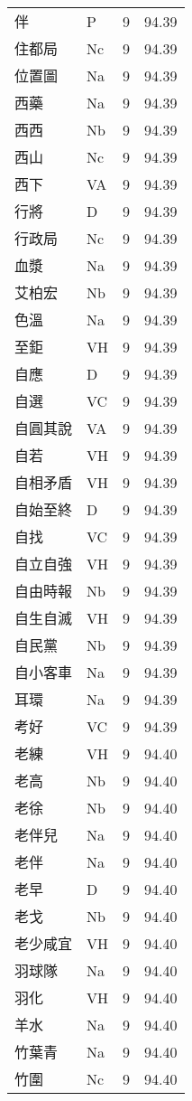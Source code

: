 \documentclass[twocolumn]{book}
\begin{document}
\begin{supertabular}{llrr}
伴 & P & 9 &  94.39\\
住都局 & Nc & 9 &  94.39\\
位置圖 & Na & 9 &  94.39\\
西藥 & Na & 9 &  94.39\\
西西 & Nb & 9 &  94.39\\
西山 & Nc & 9 &  94.39\\
西下 & VA & 9 &  94.39\\
行將 & D & 9 &  94.39\\
行政局 & Nc & 9 &  94.39\\
血漿 & Na & 9 &  94.39\\
艾柏宏 & Nb & 9 &  94.39\\
色溫 & Na & 9 &  94.39\\
至鉅 & VH & 9 &  94.39\\
自應 & D & 9 &  94.39\\
自選 & VC & 9 &  94.39\\
自圓其說 & VA & 9 &  94.39\\
自若 & VH & 9 &  94.39\\
自相矛盾 & VH & 9 &  94.39\\
自始至終 & D & 9 &  94.39\\
自找 & VC & 9 &  94.39\\
自立自強 & VH & 9 &  94.39\\
自由時報 & Nb & 9 &  94.39\\
自生自滅 & VH & 9 &  94.39\\
自民黨 & Nb & 9 &  94.39\\
自小客車 & Na & 9 &  94.39\\
耳環 & Na & 9 &  94.39\\
考好 & VC & 9 &  94.39\\
老練 & VH & 9 &  94.40\\
老高 & Nb & 9 &  94.40\\
老徐 & Nb & 9 &  94.40\\
老伴兒 & Na & 9 &  94.40\\
老伴 & Na & 9 &  94.40\\
老早 & D & 9 &  94.40\\
老戈 & Nb & 9 &  94.40\\
老少咸宜 & VH & 9 &  94.40\\
羽球隊 & Na & 9 &  94.40\\
羽化 & VH & 9 &  94.40\\
羊水 & Na & 9 &  94.40\\
竹葉青 & Na & 9 &  94.40\\
竹圍 & Nc & 9 &  94.40\\

\end{supertabular}
\end{document}
